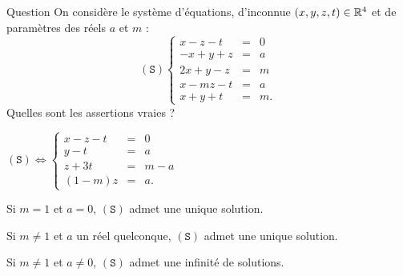 \begin{multi}[multiple,feedback=
{\[(\mathtt{S}) \Leftrightarrow  
\left\{\begin{array}{rcc}
x-z-t&=&0\\
y-t&=&a\\ 
y+z+2t&=&m \\
(1-m)z&=&a \end{array}\right.
\Leftrightarrow  
\left\{\begin{array}{rcc}
x-z-t&=&0\\
y-t&=&a\\ 
z+3t&=&m-a \\
(1-m)z&=&a.\end{array}\right.\]
\begin{enumerate}
\item[-]Si \(m=1\) et \(a\neq 0\), \((\mathtt{S})\) n'admet pas  de solution.
\item[-]Si \(m=1\) et \(a= 0\), \((\mathtt{S})\) admet une infinité de solutions.
\item[-]Si \(m\neq1\), \((\mathtt{S})\) admet une unique solution.
\end{enumerate}
}]{Question}
On considère le système d'équations, d'inconnue \((x,y,z,t) \in \mathbb{R}^4\) et  de paramètres des réels  \(a\) et \(m\) : 
\[(\mathtt{S})  
\left\{\begin{array}{rcc}
x-z-t&=&0\\
-x+y+z&=&a\\ 
2x+y-z&=&m \\
x-mz-t&=&a \\
x+y+t&=&m.\end{array}\right.\]
Quelles sont les assertions vraies ?

    \item* \((\mathtt{S}) \Leftrightarrow
\left\{\begin{array}{rcc}
x-z-t&=&0\\
y-t&=&a\\
z+3t&=&m-a \\
(1-m)z&=&a.\end{array}\right.\)
    \item Si \(m=1\) et \(a=0\),  \((\mathtt{S})\) admet une unique solution.
    \item* Si \(m \neq 1\) et \(a\) un réel quelconque,  \((\mathtt{S})\) admet une unique solution.
    \item Si \(m \neq 1\) et \(a\neq 0\), \((\mathtt{S})\) admet une infinité de solutions.
\end{multi}


